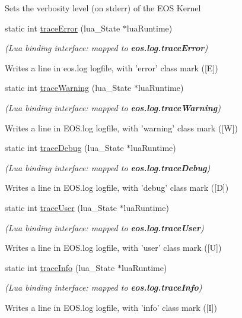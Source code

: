 \begin{CompactItemize}
\begin{CompactList}
 Sets the verbosity level (on stderr) of the EOS Kernel \item\end{CompactList}\item 
static int \hyperlink{structEOSKernel_9d25589438c403f7b8db9c77bb354a0c}{traceError} (lua\_\-State $\ast$luaRuntime)
\begin{CompactList}\small\item\em {\em (Lua binding interface: mapped to {\bf eos.log.traceError})\/}\par
\par
 Writes a line in eos.log logfile, with 'error' class mark (\mbox{[}E\mbox{]}) \item\end{CompactList}\item 
static int \hyperlink{structEOSKernel_186131b875c0871e4b0e5d4f9a484b16}{traceWarning} (lua\_\-State $\ast$luaRuntime)
\begin{CompactList}\small\item\em {\em (Lua binding interface: mapped to {\bf eos.log.traceWarning})\/}\par
\par
 Writes a line in EOS.log logfile, with 'warning' class mark (\mbox{[}W\mbox{]}) \item\end{CompactList}\item 
static int \hyperlink{structEOSKernel_3407dd17642df22065837296f2a49f8a}{traceDebug} (lua\_\-State $\ast$luaRuntime)
\begin{CompactList}\small\item\em {\em (Lua binding interface: mapped to {\bf eos.log.traceDebug})\/}\par
\par
 Writes a line in EOS.log logfile, with 'debug' class mark (\mbox{[}D\mbox{]}) \item\end{CompactList}\item 
static int \hyperlink{structEOSKernel_29224ae2d81261b6f4d859f6dfcde468}{traceUser} (lua\_\-State $\ast$luaRuntime)
\begin{CompactList}\small\item\em {\em (Lua binding interface: mapped to {\bf eos.log.traceUser})\/}\par
\par
 Writes a line in EOS.log logfile, with 'user' class mark (\mbox{[}U\mbox{]}) \item\end{CompactList}\item 
static int \hyperlink{structEOSKernel_dfbb944ca4916e758c9e3ada4c3f3644}{traceInfo} (lua\_\-State $\ast$luaRuntime)
\begin{CompactList}\small\item\em {\em (Lua binding interface: mapped to {\bf eos.log.traceInfo})\/}\par
\par
 Writes a line in EOS.log logfile, with 'info' class mark (\mbox{[}I\mbox{]}) \item\end{CompactList}\end{CompactItemize}
